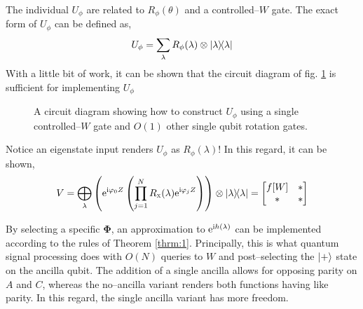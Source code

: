 \documentclass{article}
\begin{document}
The individual $U_{\phi}$ are related to $R_\phi(\theta)$ and a controlled--$W$ gate. The exact form of $U_{\phi}$ can be defined as,
\begin{equation}\label{eq:u_phi}
    U_{\phi} = \sum_\lambda R_\phi(\lambda)\otimes \ketbra{\lambda}
\end{equation}
With a little bit of work, it can be shown that the circuit diagram of fig. \ref{fig:u_phi} is sufficient for implementing $U_{\phi}$

\begin{figure}[!ht]
    \centering
    \caption{A circuit diagram showing how to construct $U_{\phi}$ using a single controlled--$W$ gate and $O(1)$ other single qubit rotation gates.}
    \label{fig:u_phi}
\end{figure}

Notice an eigenstate input renders $U_{\phi}$ as $R_\phi(\lambda)$! In this regard, it can be shown,
\begin{equation}
    V = \bigoplus_{\lambda} \left(\mathrm{e}^{\mathrm{i}\varphi_0 Z} \left(\prod_{j=1}^N R_{\textsc{x}}(
    \lambda)\mathrm{e}^{\mathrm{i}\varphi_j Z} \right) \right)\otimes\ketbra{\lambda} = \begin{bmatrix}f[W] & * \\ * & *\end{bmatrix}
\end{equation}


By selecting a specific $\boldsymbol{\Phi}$, an approximation to $\mathrm{e}^{\mathrm{i} h(\lambda)}$ can be implemented according to the rules of Theorem \ref{thrm:1}. Principally, this is what quantum signal processing does with $O(N)$ queries to $W$ and post--selecting the $\ket{+}$ state on the ancilla qubit. The addition of a single ancilla allows for opposing parity on $A$ and $C$, whereas the no--ancilla variant \cite{LC19} renders both functions having like parity. In this regard, the single ancilla variant has more freedom. 
\end{document}
